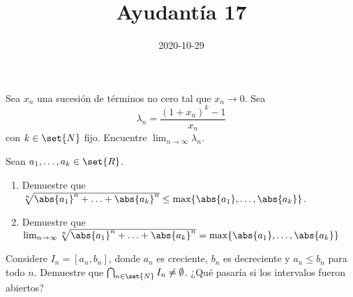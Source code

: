 \documentclass{ayudantia}
\title{Ayudantía 17}
\date{2020-10-29}
\begin{document}
\maketitle

\begin{prob}
    Sea \(x_n\) una sucesión de términos no cero tal que \(x_n\rightarrow 0\). Sea
    \begin{equation*}
        \lambda_n=\frac{(1+x_n)^k-1}{x_n}
    \end{equation*}
    con \(k\in\set{N}\) fijo. Encuentre \(\lim_{n\rightarrow\infty}\lambda_n\).
\end{prob}

\begin{ans}
    \begin{sol}
        
    \end{sol}
\end{ans}



\begin{prob}
    Sean \(a_1,\ldots,a_k\in\set{R}\).
    \begin{enumerate}[label=(\alph*)]
        \item Demuestre que \(\sqrt[n]{\abs{a_1}^n+\ldots+\abs{a_k}^n}\leq\max\{\abs{a_1},\ldots,\abs{a_k}\}\).
        \item Demuestre que \(\lim_{n\rightarrow\infty}\sqrt[n]{\abs{a_1}^n+\ldots+\abs{a_k}^n}=\max\{\abs{a_1},\ldots,\abs{a_k}\}\)
    \end{enumerate}
\end{prob}

\begin{ans}
    \begin{sol}

    \end{sol}
\end{ans}



\begin{prob}
    Considere \(I_n=[a_n,b_n]\), donde \(a_n\) es creciente, \(b_n\) es decreciente y \(a_n\leq b_n\) para todo \(n\). Demuestre que \(\bigcap_{n\in\set{N}}I_n\neq\emptyset\). ¿Qué pasaría si los intervalos fueron abiertos?
\end{prob}

\begin{ans}
    \begin{sol}

    \end{sol}
\end{ans}
\end{document}
